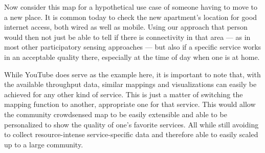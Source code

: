 Now consider this map for a hypothetical use case of someone having to move to a new place. It is common today to check the new apartment's location for good internet access, both wired as well as mobile. Using our approach that person would then not just be able to tell if there is connectivity in that area --- as in most other participatory sensing approaches --- but also if a specific service works in an acceptable quality there, especially at the time of day when one is at home.

While YouTube does serve as the example here, it is important to note that, with the available throughput data, similar mappings and visualizations can easily be achieved for any other kind of service. This is just a matter of switching the mapping function to another, appropriate one for that service. This would allow the community crowdsensed map to be easily extensible and able to be personalized to show the quality of one's favorite services. All while still avoiding to collect resource-intense service-specific data and therefore able to easily scaled up to a large community.







